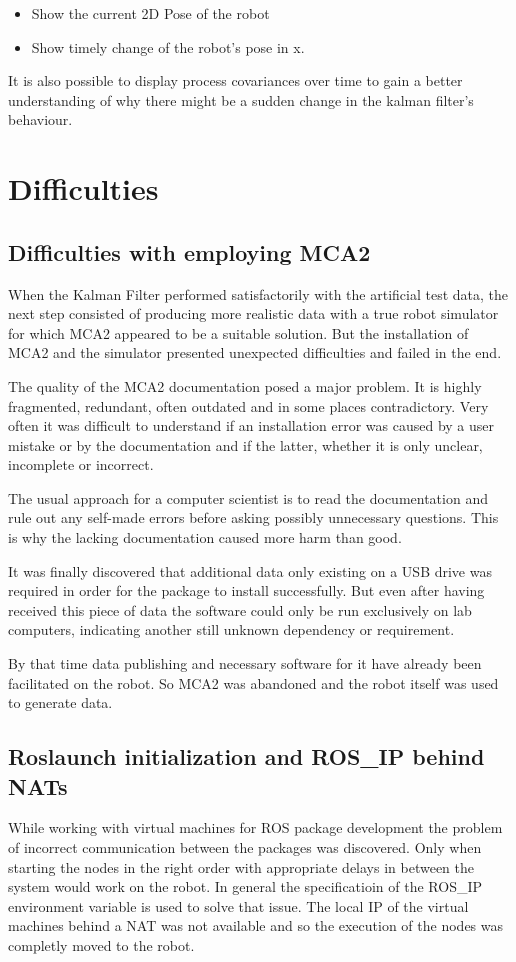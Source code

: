 \begin{itemize}
\item Show the current 2D Pose of the robot
\item Show timely change of the robot's pose in x.
\end{itemize}

It is also possible to display process covariances over time to gain a better understanding of why there might be a sudden change in the kalman filter's behaviour.

\section{Difficulties}
\subsection{Difficulties with employing MCA2}
When the Kalman Filter performed satisfactorily with the artificial test data, the next step consisted of producing more realistic data with a true robot simulator for which MCA2 appeared to be a suitable solution. But the installation of MCA2 and the simulator presented unexpected difficulties and failed in the end.

The quality of the MCA2 documentation posed a major problem. It is highly fragmented, redundant, often outdated and in some places contradictory. Very often it was difficult to understand if an installation error was caused by a user mistake or by the documentation and if the latter, whether it is only unclear, incomplete or incorrect. 

The usual approach for a computer scientist is to read the documentation and rule out any self-made errors before asking possibly unnecessary questions. This is why the lacking documentation caused more harm than good.

It was finally discovered that additional data only existing on a USB drive was required in order for the package to install successfully. But even after having received this piece of data the software could only be run exclusively on lab computers, indicating another still unknown dependency or requirement.

By that time data publishing and necessary software for it have already been facilitated on the robot. So MCA2 was abandoned and the robot itself was used to generate data.

\subsection{Roslaunch initialization and ROS\_IP behind NATs}
While working with virtual machines for ROS package development the problem of incorrect communication between the packages was discovered. Only when starting the nodes in the right order with appropriate delays in between the system would work on the robot. In general the specificatioin of the ROS\_IP environment variable is used to solve that issue. The local IP of the virtual machines behind a NAT was not available and so the execution of the nodes was completly moved to the robot.

